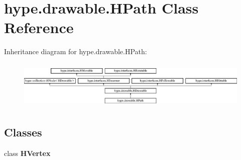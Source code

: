 \hypertarget{classhype_1_1drawable_1_1_h_path}{\section{hype.\-drawable.\-H\-Path Class Reference}
\label{classhype_1_1drawable_1_1_h_path}
}
Inheritance diagram for hype.\-drawable.\-H\-Path\-:\begin{figure}[H]
\begin{center}
\leavevmode
\includegraphics[height=2.333333cm]{classhype_1_1drawable_1_1_h_path}
\end{center}
\end{figure}
\subsection*{Classes}
\begin{DoxyCompactItemize}
\item 
class {\bfseries H\-Vertex}
\end{DoxyCompactItemize}

